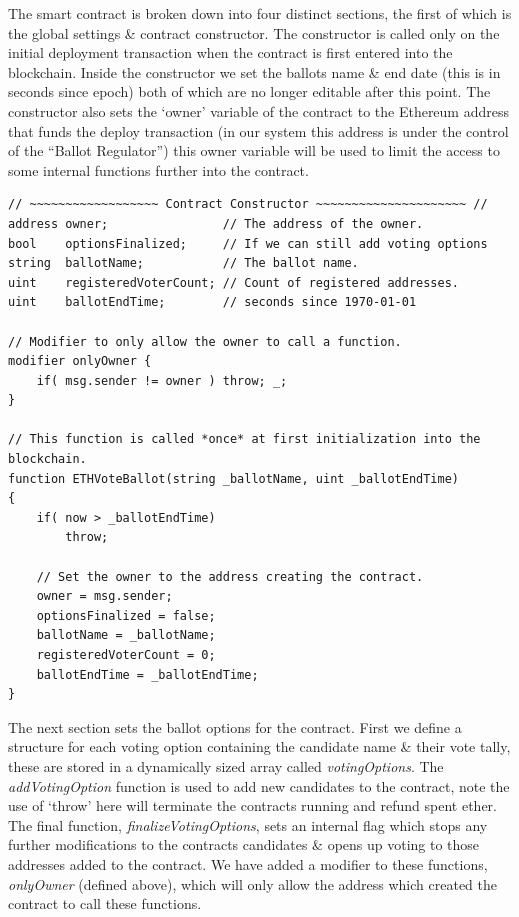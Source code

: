 \documentclass{article}
\begin{document}
The smart contract is broken down into four distinct sections, the first of which is the global settings \& contract constructor. The constructor is called only on the initial deployment transaction when the contract is first entered into the blockchain. Inside the constructor we set the ballots name \& end date (this is in seconds since epoch) both of which are no longer editable after this point. The constructor also sets the `owner' variable of the contract to the Ethereum address that funds the deploy transaction (in our system this address is under the control of the ``Ballot Regulator'') this owner variable will be used to limit the access to some internal functions further into the contract.

\begin{lstlisting}[caption=Contract constructor called when deploying the contract.]
// ~~~~~~~~~~~~~~~~~~ Contract Constructor ~~~~~~~~~~~~~~~~~~~~~ //
address owner;                // The address of the owner. 
bool    optionsFinalized;     // If we can still add voting options
string  ballotName;           // The ballot name.
uint    registeredVoterCount; // Count of registered addresses.
uint    ballotEndTime;        // seconds since 1970-01-01

// Modifier to only allow the owner to call a function.
modifier onlyOwner {
    if( msg.sender != owner ) throw; _;
}

// This function is called *once* at first initialization into the blockchain.
function ETHVoteBallot(string _ballotName, uint _ballotEndTime)
{
    if( now > _ballotEndTime)
        throw;

    // Set the owner to the address creating the contract.
    owner = msg.sender;
    optionsFinalized = false; 
    ballotName = _ballotName;
    registeredVoterCount = 0;
    ballotEndTime = _ballotEndTime;
}
\end{lstlisting}

\cleardoublepage
The next section sets the ballot options for the contract. First we define a structure for each voting option containing the candidate name \& their vote tally, these are stored in a dynamically sized array called \textit{votingOptions}. The \textit{addVotingOption} function is used to add new candidates to the contract, note the use of `throw' here will terminate the contracts running and refund spent ether. The final function, \textit{finalizeVotingOptions}, sets an internal flag which stops any further modifications to the contracts candidates \& opens up voting to those addresses added to the contract. We have added a modifier to these functions, \textit{onlyOwner} (defined above), which will only allow the address which created the contract to call these functions.
\end{document}
